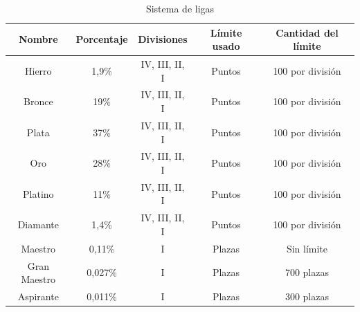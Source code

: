 \begin{table}[h]
	\begin{tabular}{c|c|c|c|c}
		\textbf{Nombre} & \textbf{Porcentaje} & \textbf{Divisiones} & \textbf{Límite usado} & \textbf{Cantidad del límite} \\ \hline \hline
		Hierro & 1,9\% & IV, III, II, I & Puntos  & 100 por división \\ \hline
		Bronce & 19\% & IV, III, II, I & Puntos  & 100 por división \\ \hline
		Plata & 37\% & IV, III, II, I & Puntos  & 100 por división \\ \hline
		Oro & 28\% & IV, III, II, I & Puntos  & 100 por división \\ \hline
		Platino & 11\% & IV, III, II, I & Puntos  & 100 por división \\ \hline
		Diamante & 1,4\% & IV, III, II, I & Puntos  & 100 por división \\ \hline
		Maestro & 0,11\% & I & Plazas  & Sin límite \\ \hline
		Gran Maestro & 0,027\% & I & Plazas  & 700 plazas \\ \hline
		Aspirante & 0,011\% & I & Plazas  & 300 plazas \\
	\end{tabular}
	\caption{Sistema de ligas}
	\label{tab:ligas}
\end{table}
 

